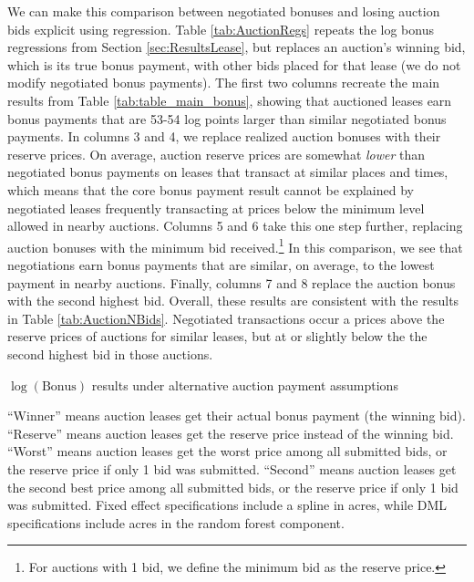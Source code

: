 We can make this comparison between negotiated bonuses and losing auction bids explicit using regression. Table \ref{tab:AuctionRegs} repeats the log bonus regressions from Section \ref{sec:ResultsLease}, but replaces an auction's winning bid, which is its true bonus payment, with other bids placed for that lease (we do not modify negotiated bonus payments). The first two columns recreate the main results from Table \ref{tab:table_main_bonus}, showing that auctioned leases earn bonus payments that are 53-54 log points larger than similar negotiated bonus payments.  In columns 3 and 4, we replace realized auction bonuses with their reserve prices.  On average, auction reserve prices are somewhat \textit{lower} than negotiated bonus payments on leases that transact at similar places and times, which means that the core bonus payment result cannot be explained by negotiated leases frequently transacting at prices below the minimum level allowed in nearby auctions.  Columns 5 and 6 take this one step further, replacing auction bonuses with the minimum bid received.\footnote{For auctions with 1 bid, we define the minimum bid as the reserve price.}  In this comparison, we see that negotiations earn bonus payments that are similar, on average, to the lowest payment in nearby auctions.  Finally, columns 7 and 8 replace the auction bonus with the second highest bid.  Overall, these results are consistent with the results in Table \ref{tab:AuctionNBids}.  Negotiated transactions occur a prices above the reserve prices of auctions for similar leases, but at or slightly below the the second highest bid in those auctions. 

\addtolength{\tabcolsep}{15pt}
\begin{table}[htpb]
\begin{center}
\begin{threeparttable}
	\caption{$\log(\text{Bonus})$ results under alternative auction payment assumptions}
	\label{tab:AuctionRegs}
 	\small
   	            
    \footnotesize
    \begin{tablenotes}
    	\item ``Winner'' means auction leases get their actual bonus payment (the winning bid).  ``Reserve'' means auction leases get the reserve price instead of the winning bid.  ``Worst'' means auction leases get the worst price among all submitted bids, or the reserve price if only 1 bid was submitted.  ``Second'' means auction leases get the second best price among all submitted bids, or the reserve price if only 1 bid was submitted.  Fixed effect specifications include a spline in acres, while DML specifications include acres in the random forest component.
    \end{tablenotes}
\end{threeparttable}
\end{center}	
\end{table}
\addtolength{\tabcolsep}{-8pt} 


